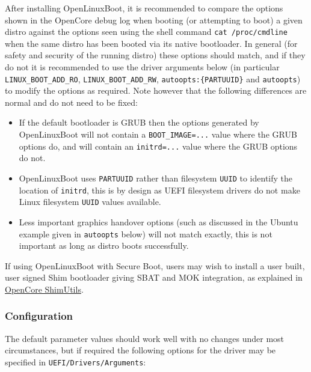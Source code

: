 \documentclass[]{article}
\providecommand{\tightlist}{%
  \setlength{\itemsep}{0pt}\setlength{\parskip}{0pt}}
\begin{document}
After installing OpenLinuxBoot, it is recommended to compare the options shown in the OpenCore debug
log when booting (or attempting to boot) a given distro against the options seen using the shell command
\texttt{cat /proc/cmdline} when the same distro has been booted via its native bootloader.
In general (for safety and security of the running distro) these options should match, and if they do not
it is recommended to use the driver arguments below (in particular \texttt{LINUX\_BOOT\_ADD\_RO},
\texttt{LINUX\_BOOT\_ADD\_RW}, \texttt{autoopts:\{PARTUUID\}} and \texttt{autoopts}) to modify the options as required.
Note however that the following differences are normal and do not need to be fixed:
\begin{itemize}
\tightlist
  \item
  If the default bootloader is GRUB then the options generated by OpenLinuxBoot will not contain a
  \texttt{BOOT\_IMAGE=...} value where the GRUB options do, and will contain an \texttt{initrd=...}
  value where the GRUB options do not.
  \item
  OpenLinuxBoot uses \texttt{PARTUUID} rather than filesystem \texttt{UUID} to identify the location
  of \texttt{initrd}, this is by design as UEFI filesystem drivers do not make Linux filesystem
  \texttt{UUID} values available.
  \item
  Less important graphics handover options (such as discussed in the Ubuntu example
  given in \texttt{autoopts} below) will not match exactly, this is not important as long
  as distro boots successfully.
\end{itemize}

If using OpenLinuxBoot with Secure Boot, users may wish to install
a user built, user signed Shim bootloader giving SBAT and MOK integration, as explained in
\href{https://github.com/acidanthera/OpenCorePkg/tree/master/Utilities/ShimUtils}{OpenCore ShimUtils}.

\subsubsection{Configuration}

The default parameter values should work well with no changes under most circumstances, but if required the following
options for the driver may be specified in \texttt{UEFI/Drivers/Arguments}:
\end{document}

